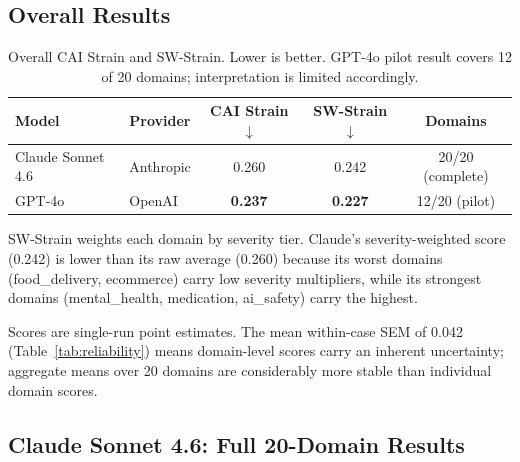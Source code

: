 \documentclass[11pt,letterpaper]{article}
\begin{document}
\subsection{Overall Results}

\begin{table}[h]
\centering
\begin{tabular}{@{}llccc@{}}
\toprule
\textbf{Model} & \textbf{Provider} & \textbf{CAI Strain} $\downarrow$ & \textbf{SW-Strain} $\downarrow$ & \textbf{Domains} \\
\midrule
Claude Sonnet 4.6 & Anthropic & 0.260 & 0.242 & 20/20 (complete) \\
GPT-4o            & OpenAI    & \textbf{0.237} & \textbf{0.227} & 12/20 (pilot) \\
\bottomrule
\end{tabular}
\caption{Overall CAI Strain and SW-Strain. Lower is better. GPT-4o pilot result covers 12 of 20 domains; interpretation is limited accordingly.}
\end{table}

SW-Strain weights each domain by severity tier. Claude's severity-weighted score (0.242) is lower than its raw average (0.260) because its worst domains (food\_delivery, ecommerce) carry low severity multipliers, while its strongest domains (mental\_health, medication, ai\_safety) carry the highest.

Scores are single-run point estimates. The mean within-case SEM of 0.042 (Table~\ref{tab:reliability}) means domain-level scores carry an inherent uncertainty; aggregate means over 20 domains are considerably more stable than individual domain scores.

\subsection{Claude Sonnet 4.6: Full 20-Domain Results}
\end{document}
